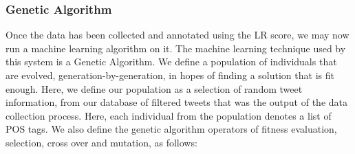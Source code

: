 \subsubsection{Genetic Algorithm}
Once the data has been collected and annotated using the LR score, we may now run a machine learning algorithm on it. The machine learning technique used by this system is a Genetic Algorithm. We define a population of individuals that are evolved, generation-by-generation, in hopes of finding a solution that is fit enough. Here, we define our population as a selection of random tweet information, from our database of filtered tweets that was the output of the data collection process. Here, each individual from the population denotes a list of POS tags. We also define the genetic algorithm operators of fitness evaluation, selection, cross over and mutation, as follows:
